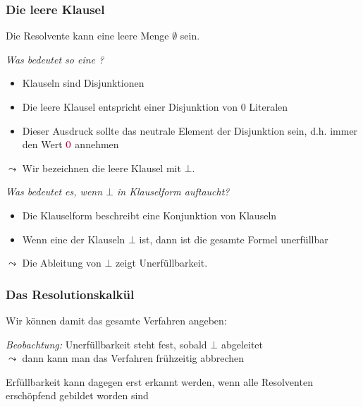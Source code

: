 \documentclass[aspectratio=1610,onlymath]{beamer}
\begin{document}
\begin{frame}\frametitle{Die leere Klausel}

Die Resolvente kann eine leere Menge $\emptyset$ sein.\\[1ex]

\medskip

\emph{Was bedeutet so eine ?}\pause
\begin{itemize}
\item Klauseln sind Disjunktionen
\item Die leere Klausel entspricht einer Disjunktion von $0$ Literalen
\item Dieser Ausdruck sollte das neutrale Element der Disjunktion sein, d.h. immer den Wert $\textcolor{purple}{0}$ annehmen
\end{itemize}
$\leadsto$ Wir bezeichnen die leere Klausel mit $\bot$.
\bigskip\pause

\emph{Was bedeutet es, wenn $\bot$ in Klauselform auftaucht?}\pause
\begin{itemize}
\item Die Klauselform beschreibt eine Konjunktion von Klauseln
\item Wenn eine der Klauseln $\bot$ ist, dann ist die gesamte Formel unerfüllbar
\end{itemize}
$\leadsto$ Die Ableitung von $\bot$ zeigt Unerfüllbarkeit.

\end{frame}

\begin{frame}\frametitle{Das Resolutionskalkül}

Wir können damit das gesamte Verfahren angeben:

\pause

\emph{Beobachtung:} Unerfüllbarkeit steht fest, sobald $\bot$ abgeleitet \\
$\leadsto$ dann kann man das Verfahren frühzeitig abbrechen
\medskip

Erfüllbarkeit kann dagegen erst erkannt werden, wenn alle Resolventen erschöpfend gebildet worden sind

\end{frame}
\end{document}
